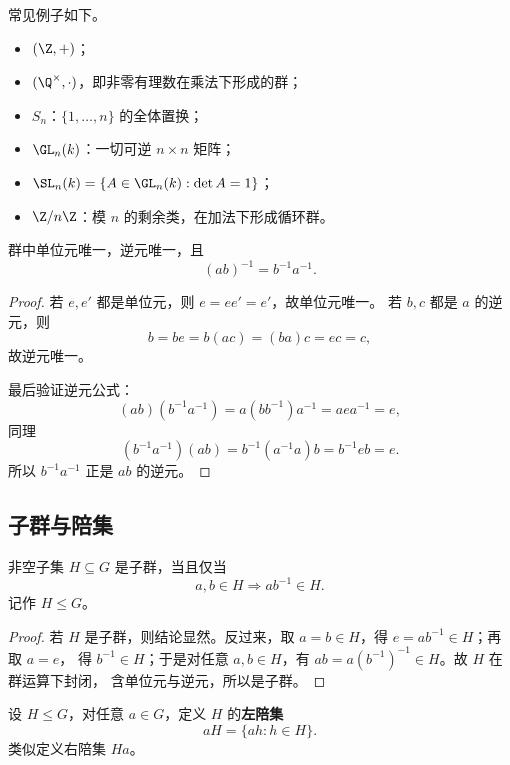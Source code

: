 \begin{example}
常见例子如下。
\begin{itemize}
  \item $(\Z,+)$；
  \item $(\Q^\times,\cdot)$，即非零有理数在乘法下形成的群；
  \item $S_n$：$\{1,\dots,n\}$ 的全体置换；
  \item $\GL_n(k)$：一切可逆 $n\times n$ 矩阵；
  \item $\SL_n(k)=\{A\in \GL_n(k):\det A=1\}$；
  \item $\Z/n\Z$：模 $n$ 的剩余类，在加法下形成循环群。
\end{itemize}
\end{example}

\begin{proposition}
群中单位元唯一，逆元唯一，且
\begin{equation}
  (ab)^{-1}=b^{-1}a^{-1}.
\end{equation}
\end{proposition}

\begin{proof}
若 $e,e'$ 都是单位元，则 $e=ee'=e'$，故单位元唯一。
若 $b,c$ 都是 $a$ 的逆元，则
\[
  b=be=b(ac)=(ba)c=ec=c,
\]
故逆元唯一。

最后验证逆元公式：
\[
  (ab)(b^{-1}a^{-1})=a(bb^{-1})a^{-1}=aea^{-1}=e,
\]
同理
\[
  (b^{-1}a^{-1})(ab)=b^{-1}(a^{-1}a)b=b^{-1}eb=e.
\]
所以 $b^{-1}a^{-1}$ 正是 $ab$ 的逆元。
\end{proof}

\subsection{子群与陪集}

\begin{definition}[子群判别准则]
非空子集 $H\subseteq G$ 是子群，当且仅当
\begin{equation}
  a,b\in H \Longrightarrow ab^{-1}\in H.
\end{equation}
记作 $H\le G$。
\end{definition}

\begin{proof}
若 $H$ 是子群，则结论显然。反过来，取 $a=b\in H$，得 $e=ab^{-1}\in H$；再取 $a=e$，
得 $b^{-1}\in H$；于是对任意 $a,b\in H$，有 $ab=a(b^{-1})^{-1}\in H$。故 $H$ 在群运算下封闭，
含单位元与逆元，所以是子群。
\end{proof}

\begin{definition}[左陪集]
设 $H\le G$，对任意 $a\in G$，定义 $H$ 的\textbf{左陪集}
\begin{equation}
  aH=\{ah:h\in H\}.
\end{equation}
类似定义右陪集 $Ha$。
\end{definition}

